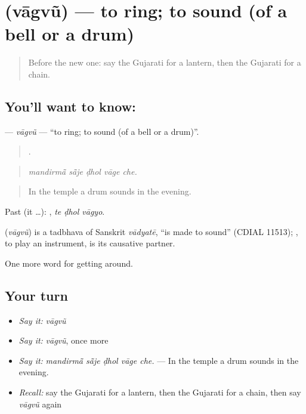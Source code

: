 \section[\texorpdfstring{\gu{વાગવું} (vāgvũ)}{વાગવું (vāgvũ)}]{ (vāgvũ) — to ring; to sound (of a bell or a drum)}

\label{lesson:GU-C396-vagvu}



\begin{quote}
Before the new one: say the Gujarati for a lantern, then the Gujarati for a chain.
\end{quote}

\subsection*{You'll want to know: }
\textbf{} — \emph{vāgvũ} — \textquotedblleft{}to ring; to sound (of a bell or a drum)\textquotedblright{}.

\begin{quote}
    .
\end{quote}

\begin{quote}
\emph{mandirmā̃ sā̃je ḍhol vāge che.}
\end{quote}

\begin{quote}
In the temple a drum sounds in the evening.
\end{quote}

Past (it …):   , \emph{te ḍhol vāgyo}.

\begin{cousinweb}
\textbf{} (\emph{vāgvũ}) is a tadbhava of Sanskrit \emph{vādyatē}, \textquotedblleft{}is made to sound\textquotedblright{} (CDIAL 11513); , to play an instrument, is its causative partner.
\end{cousinweb}

\begin{grammarlens}[title={What you've built}]
One more word for getting around.
\end{grammarlens}

\subsection*{Your turn}
\begin{itemize}
\raggedright
  \item \emph{Say it:} \emph{vāgvũ}
  \item \emph{Say it:} \emph{vāgvũ}, once more
  \item \emph{Say it:} \emph{mandirmā̃ sā̃je ḍhol vāge che.} — In the temple a drum sounds in the evening.
  \item \emph{Recall:} say the Gujarati for a lantern, then the Gujarati for a chain, then say \emph{vāgvũ} again
\end{itemize}

